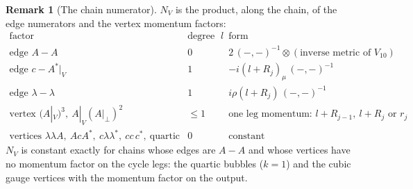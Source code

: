 \documentclass[11pt]{article}
\numberwithin{equation}{section}
\theoremstyle{plain}
\theoremstyle{definition}
\newtheorem{remark}[theorem]{Remark}
\begin{document}
\begin{remark}[The chain numerator]
\label{rem:tl-NV}
$N_V$ is the product, along the chain, of the edge numerators and the vertex momentum factors:
\[
\begin{array}{l|c|l}
\text{factor} & \text{degree in }l & \text{form}\\\hline
\text{edge }A\!-\!A & 0 & 2\,(-,-)^{-1}\otimes(\text{inverse metric of }V_{10})\\
\text{edge }c\!-\!A^*|_V & 1 & -i(l+R_j)_\mu\,(-,-)^{-1}\\
\text{edge }\lambda\!-\!\lambda & 1 & i\rho(l+R_j)\,(-,-)^{-1}\\
\text{vertex }(A|_V)^3,\ A|_V(A|_\perp)^2 & \le1 & \text{one leg momentum: }l+R_{j-1},\ l+R_j\text{ or }r_j\\
\text{vertices }\lambda\lambda A,\ AcA^*,\ c\lambda\lambda^*,\ cc\,c^*,\ \text{quartic} & 0 & \text{constant}
\end{array}
\]
$N_V$ is constant exactly for chains whose edges are $A\!-\!A$ and whose vertices have no momentum factor on the cycle legs: the quartic bubbles ($k=1$) and the cubic gauge vertices with the momentum factor on the output.
\end{remark}
\end{document}
